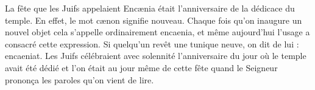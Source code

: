  La fête que les Juifs appelaient Encænia était l’anniversaire de la dédicace du temple. En effet, le mot cænon signifie nouveau. Chaque fois qu’on inaugure un nouvel objet cela s’appelle ordinairement encaenia, et même aujourd’hui l’usage a consacré cette expression. Si quelqu’un revêt une tunique neuve, on dit de lui : encaeniat. Les Juifs célébraient avec solennité l’anniversaire du jour où le temple avait été dédié et l’on était au jour même de cette fête quand le Seigneur prononça les paroles qu’on vient de lire.